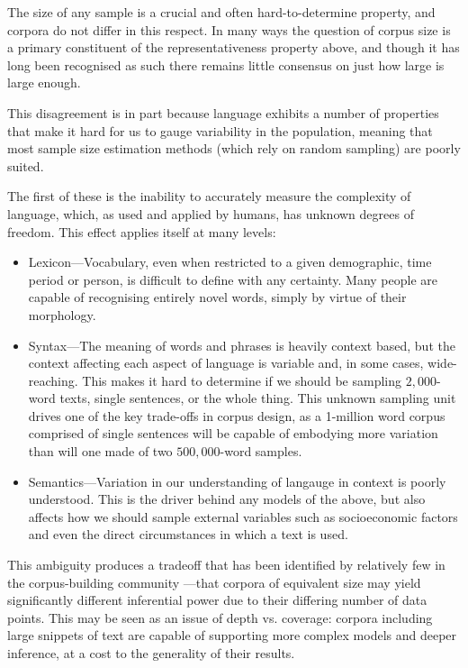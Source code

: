 The size of any sample is a crucial and often hard-to-determine property, and corpora do not differ in this respect.  In many ways the question of corpus size is a primary constituent of the representativeness property above, and though it has long been recognised as such there remains little consensus on just how large is large enough.

This disagreement is in part because language exhibits a number of properties that make it hard for us to gauge variability in the population, meaning that most sample size estimation methods (which rely on random sampling) are poorly suited.


The first of these is the inability to accurately measure the complexity of language, which, as used and applied by humans, has unknown degrees of freedom.  This effect applies itself at many levels:

\begin{itemize}
    \item Lexicon---Vocabulary, even when restricted to a given demographic, time period or person, is difficult to define with any certainty.  Many people are capable of recognising entirely novel words, simply by virtue of their morphology. %
    \item Syntax---The meaning of words and phrases is heavily context based, but the context affecting each aspect of language is variable and, in some cases, wide-reaching.  This makes it hard to determine if we should be sampling $2,000$-word texts, single sentences, or the whole thing\cite{hoey2005lexical}.  This unknown sampling unit drives one of the key trade-offs in corpus design, as a 1-million word corpus comprised of single sentences will be capable of embodying more variation than will one made of two $500,000$-word samples.
    \item Semantics---Variation in our understanding of langauge in context is poorly understood.  This is the driver behind any models of the above, but also affects how we should sample external variables such as socioeconomic factors and even the direct circumstances in which a text is used.  %
\end{itemize}

This ambiguity produces a tradeoff that has been identified by relatively few in the corpus-building community\cite{evert2006random,kilgarriff2005language}%
---that corpora of equivalent size may yield significantly different inferential power due to their differing number of data points.  This may be seen as an issue of depth vs. coverage: corpora including large snippets of text are capable of supporting more complex models and deeper inference, at a cost to the generality of their results.

